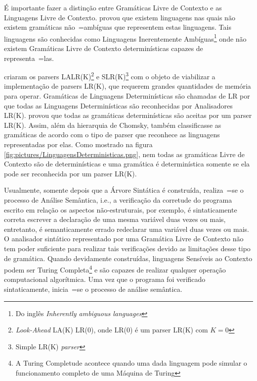 {    É importante fazer a distinção entre Gramáticas Livre de Contexto e
    as Linguagens Livre de Contexto.
     provou que existem linguagens nas quais não
    existem gramáticas não~=ambíguas que representem estas linguagens.
    Tais linguagens são conhecidas como Linguagens Inerentemente Ambíguas\footnote{Do
    inglês \textit{Inherently ambiguous languages}} onde não existem Gramáticas
    Livre de Contexto determinísticas capazes de representa~=las.

     criaram os parsers
    LALR(K)\footnote{\textit{Look-Ahead} LA(K) LR(0),
    onde LR(0) é um parser LR(K) com $K=0$
    } e
    SLR(K)\footnote{Simple LR(K) \textit{parser}} com o objeto
    de viabilizar a implementação de parsers LR(K),
    que requerem grandes quantidades de memória para operar.
    Gramáticas de Linguagens Determinísticas são chamadas de LR por que todas
    as Linguagens Determinísticas são reconhecidas por Analisadores LR(K).
     provou que todas as gramáticas
    determinísticas são aceitas por um parser LR(K).
    Assim,
    além da hierarquia de Chomsky,
    também classificasse as gramáticas de acordo com o tipo de parser
    que reconhece as linguagens representadas por elas.
    Como mostrado na figura \ref{fig:pictures/LinguagensDeterministicas.png},
    nem todas as gramáticas Livre de Contexto são de determinísticas e
    uma gramática é determinística somente se ela pode ser reconhecida por um parser LR(K).

    Usualmente,
    somente depois que a Árvore Sintática é construída,
    realiza~=se o processo de Análise Semântica,
    i.e.,
    a verificação da corretude do programa escrito em relação os aspectos não-estruturais,
    por exemplo,
    é sintaticamente correta escrever a declaração de uma mesma variável duas vezes ou mais,
    entretanto,
    é semanticamente errado redeclarar uma variável duas vezes ou mais.
    O analisador sintático representado por uma Gramática Livre de Contexto não tem poder
    suficiente para realizar tais verificações devido as limitações desse tipo de gramática.
    Quando devidamente construídas,
    linguagens Sensíveis ao Contexto podem ser Turing Completa\footnote{A Turing Completude
    acontece quando uma dada linguagem pode simular o funcionamento completo de uma Máquina
    de Turing} \cite{areThereDomainSpecificLanguages,contextSensitiveParsing} e
    são capazes de realizar qualquer operação computacional algorítmica.
    Uma vez que o programa foi verificado sintaticamente,
    inicia~=se o processo de análise semântica.

}
